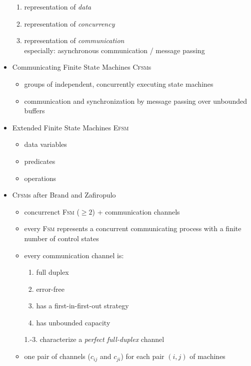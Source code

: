 \documentclass[a4paper, 10pt]{article}
\begin{document}
\begin{itemize}
    \begin{enumerate}
        \item representation of \emph{data}
        \item representation of \emph{concurrency}
        \item representation of \emph{communication}\\
        especially: asynchronous communication / message passing
    \end{enumerate}
    \item Communicating Finite State Machines \textsc{Cfsm}s
    \begin{itemize}
        \item groups of independent, concurrently executing state machines
        \item communication and synchronization by message passing over unbounded buffers
    \end{itemize}
    \item Extended Finite State Machines \textsc{Efsm}
    \begin{itemize}
        \item data variables
        \item predicates
        \item operations
    \end{itemize}
    \item \textsc{Cfsm}s after Brand and Zafiropulo
    \begin{shaded}
    \begin{itemize}
        \item concurrenct \textsc{Fsm} ($\geq2$) + communication channels
        \item every \textsc{Fsm} represents a concurrent communicating process with a finite number of control states
        \item every communication channel is:
        \begin{enumerate}
            \item full duplex
            \item error-free
            \item has a first-in-first-out strategy
            \item has unbounded capacity
        \end{enumerate}
        {\tiny 1.-3. characterize a \emph{perfect full-duplex} channel}
        \item one pair of channels ($c_{ij}$ and $c_{ji}$) for each pair $(i,j)$ of machines
    \end{itemize}

\end{shaded}
\end{itemize}
\end{document}
